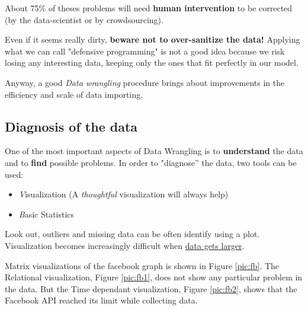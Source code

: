 About 75\% of theses problems will need \textbf{human intervention} to be corrected (by the data-scientist or by crowdsourcing).

Even if it seems really dirty, \textbf{beware not to over-sanitize the data!} Applying what we can call "defensive programming" is not a good idea because we risk losing any interesting data, keeping only the ones that fit perfectly in our model.

Anyway, a good \emph{Data wrangling} procedure brings about improvements in the efficiency and scale of data importing.

\subsection{Diagnosis of the data}

One of the most important aspects of Data Wrangling is to {\bf understand} the data and to {\bf find} possible problems. In order to "diagnose'' the data, two tools can be used:
\begin{itemize}
 \item {\emph Visualization} (A {\it thoughtful} visualization will always help)
 \item {\emph Basic Statistics} 
\end{itemize}

Look out, outliers and missing data can be often identify using a plot. Visualization becomes increasingly difficult when  \href{http://fellinlovewithdata.com/guides/how-do-you-visualize-too-much-data}{data gets larger}.

Matrix visualizations of the facebook graph is shown in Figure \ref{pic:fb}. The Relational visualization, Figure \ref{pic:fb1}, does not show any particular problem in the data. But the Time dependant visualization, Figure \ref{pic:fb2}, shows that the Facebook API reached its limit while collecting data.

